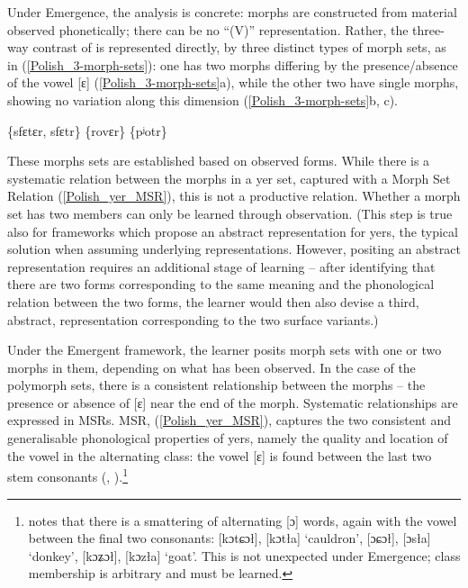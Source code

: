 Under Emergence, the analysis is concrete: morphs are constructed from material observed phonetically; there can be no ``(V)'' representation. Rather, the three-way contrast of  is represented directly, by three distinct types of morph sets, as in (\ref{Polish_3-morph-sets}): one has two morphs differing by the presence/absence of the vowel [ɛ] (\ref{Polish_3-morph-sets}a), while the other two have single morphs, showing no variation along this dimension (\ref{Polish_3-morph-sets}b, c).


\begin{example} 
\label{Polish_3-morph-sets}
\ea \{sfɛtɛr, sfɛtr\}
\ex \{rovɛr\}
\ex \{pʲotr\}
\z
\end{example}


These morphs sets are established based on observed forms. While there is a systematic relation between the morphs in a yer set, captured with a Morph Set Relation (\ref{Polish_yer_MSR}), this is not a productive relation. Whether a morph set has two members can only be learned through observation.  (This step is true also for frameworks which propose an abstract representation for  yers, the typical solution when assuming underlying representations. However, positing an abstract representation requires an additional stage of learning -- after identifying that there are two forms corresponding to the same meaning and the phonological relation between the two forms, the learner would then also devise a third, abstract, representation corresponding to the two surface variants.)

Under the Emergent framework, the learner posits morph sets with one or two morphs in them, depending on what has been observed. In the case of the polymorph sets, there is a consistent relationship between the morphs -- the presence or absence of [ɛ] near the end of the morph. Systematic relationships are expressed in MSRs. MSR, (\ref{Polish_yer_MSR}), captures the two  consistent and generalisable phonological properties of yers, namely the  quality and location of the vowel in the alternating class: the vowel [ɛ] is found between the last two stem consonants (\citealt[30]{Piotrowski+:1992}, \citealt[184--185]{Jarosz:2005_BLS}).\footnote{\citet[1140]{Rubach:2013} notes that there is a smattering of alternating [ɔ] words, again with the vowel between the final two consonants:  [kɔtɕɔł], [kɔtła] `cauldron',  [ɔɕɔł],  [ɔsła] `donkey',  [kɔʑɔł],  [kɔzła] `goat'. This is not unexpected under Emergence; class membership is arbitrary and must be learned.}


